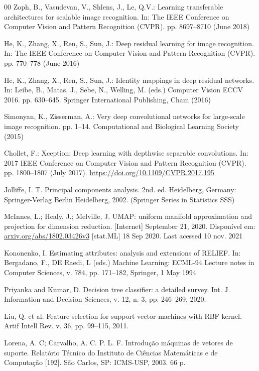 \documentclass[preprint,12pt]{elsarticle}
\begin{document}
\begin{thebibliography}{00}
Zoph, B., Vasudevan, V., Shlens, J., Le, Q.V.: Learning transferable architectures for scalable image recognition. In: The IEEE Conference on Computer Vision and Pattern Recognition (CVPR). pp. 8697--8710 (June 2018)

He, K., Zhang, X., Ren, S., Sun, J.: Deep residual learning for image recognition. In: The IEEE Conference on Computer Vision and Pattern Recognition (CVPR). pp. 770--778 (June 2016)

He, K., Zhang, X., Ren, S., Sun, J.: Identity mappings in deep residual networks. In: Leibe, B., Matas, J., Sebe, N., Welling, M. (eds.) Computer Vision ECCV 2016. pp. 630--645. Springer International Publishing, Cham (2016)

Simonyan, K., Zisserman, A.: Very deep convolutional networks for large-scale image recognition. pp. 1--14. Computational and Biological Learning Society (2015)

Chollet, F.: Xception: Deep learning with depthwise separable convolutions. In: 2017 IEEE Conference on Computer Vision and Pattern Recognition (CVPR). pp. 1800--1807 (July 2017). \url{https://doi.org/10.1109/CVPR.2017.195}

Jolliffe, I. T. Principal components analysis. 2nd. ed. Heidelberg, Germany: Springer-Verlag Berlin Heidelberg, 2002. (Springer Series in Statistics SSS)

McInnes, L.; Healy, J.; Melville, J. UMAP: uniform manifold approximation and projection for dimension reduction. [Internet] September 21, 2020. Disponível em: \url{arxiv.org/abs/1802.03426v3} [stat.ML] 18 Sep 2020. Last acessed 10 nov. 2021

Kononenko, I. Estimating attributes: analysis and extensions of RELIEF. In: Bergadano, F., DE Raedi, L (eds.) Machine Learning: ECML-94 Lecture notes in Computer Sciences, v. 784, pp. 171--182, Springer, 1 May 1994

Priyanka and Kumar, D. Decision tree classifier: a detailed survey. Int. J. Information and Decision Sciences, v. 12, n. 3, pp. 246--269, 2020.

Liu, Q. et al. Feature selection for support vector machines with RBF kernel. Artif Intell Rev. v. 36, pp. 99--115, 2011.

Lorena, A. C; Carvalho, A. C. P. L. F. Introdução máquinas de vetores de suporte. Relatório Técnico do Instituto de Ciências Matemáticas e de Computação [192]. São Carlos, SP: ICMS-USP, 2003. 66 p.


\end{thebibliography}
\end{document}
